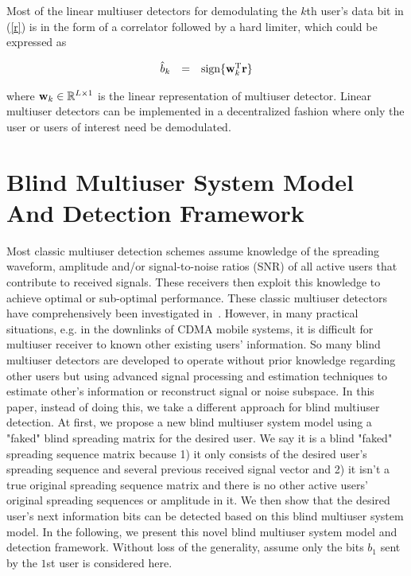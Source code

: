 \documentclass[a4paper,11pt,fleqn]{article}
\newcommand{\br}{{\mathbf r}}
\newcommand{\bw}{{\bf w}}
\begin{document}
Most of the linear multiuser detectors for demodulating the $k$th
user's data bit in (\ref{r}) is in the form of a correlator
followed by a hard limiter, which could be expressed as

\begin{equation}
\begin{array}{rcl}
\hat{b}_k &=& \mbox{sign}\{\bw_k^{\rm T}\br\}
\end{array} \label{linear}
\end{equation}

\noindent where $\bw_k \in \mathbb{R}^{L\times 1}$ is the linear
representation of multiuser detector. Linear multiuser detectors
can be implemented in a decentralized fashion where only the user
or users of interest need be demodulated.

\pagebreak

\section{Blind Multiuser System Model And Detection Framework}

Most classic multiuser detection schemes assume knowledge of the
spreading waveform, amplitude and/or signal-to-noise ratios (SNR)
of all active users that contribute to received signals. These
receivers then exploit this knowledge to achieve optimal or
sub-optimal performance. These classic multiuser detectors have
comprehensively been investigated in~\cite{Verd98}. However, in
many practical situations, e.g. in the downlinks of CDMA mobile
systems, it is difficult for multiuser receiver to known other
existing users' information. So many blind multiuser detectors are
developed to operate without prior knowledge regarding other users
but using advanced signal processing and estimation techniques to
estimate other's information or reconstruct signal or noise
subspace. In this paper, instead of doing this, we take a
different approach for blind multiuser detection. At first, we
propose a new blind multiuser system model using a "faked" blind
spreading matrix for the desired user. We say it is a blind
"faked" spreading sequence matrix because 1) it only consists of
the desired user's spreading sequence and several previous
received signal vector and 2) it isn't a true original spreading
sequence matrix and there is no other active users' original
spreading sequences or amplitude in it. We then show that the
desired user's next information bits can be detected based on this
blind multiuser system model. In the following, we present this
novel blind multiuser system model and detection framework.
Without loss of the generality, assume only the bits $b_1$ sent by
the $1$st user is considered here.
\end{document}
